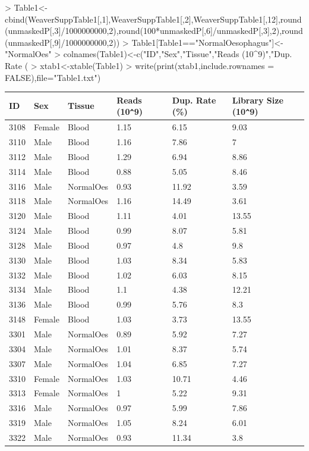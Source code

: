 \documentclass{article}
\begin{document}
\begin{Schunk}
\begin{Sinput}
> Table1<-cbind(WeaverSuppTable1[,1],WeaverSuppTable1[,2],WeaverSuppTable1[,12],round(unmaskedP[,3]/1000000000,2),round(100*unmaskedP[,6]/unmaskedP[,3],2),round(unmaskedP[,9]/1000000000,2))
> Table1[Table1=="NormalOesophagus"]<-"NormalOes"
> colnames(Table1)<-c("ID","Sex","Tissue","Reads (10^9)","Dup. Rate (%
> xtab1<-xtable(Table1)
> write(print(xtab1,include.rownames = FALSE),file="Table1.txt")
\end{Sinput}
\begin{table}[ht]
\centering
\begin{tabular}{llllll}
  \hline
ID & Sex & Tissue & Reads (10\verb|^|9) & Dup. Rate (\%) & Library Size (10\verb|^|9) \\ 
  \hline
3108 & Female & Blood & 1.15 & 6.15 & 9.03 \\ 
  3110 & Male & Blood & 1.16 & 7.86 & 7 \\ 
  3112 & Male & Blood & 1.29 & 6.94 & 8.86 \\ 
  3114 & Male & Blood & 0.88 & 5.05 & 8.46 \\ 
  3116 & Male & NormalOes & 0.93 & 11.92 & 3.59 \\ 
  3118 & Male & NormalOes & 1.16 & 14.49 & 3.61 \\ 
  3120 & Male & Blood & 1.11 & 4.01 & 13.55 \\ 
  3124 & Male & Blood & 0.99 & 8.07 & 5.81 \\ 
  3128 & Male & Blood & 0.97 & 4.8 & 9.8 \\ 
  3130 & Male & Blood & 1.03 & 8.34 & 5.83 \\ 
  3132 & Male & Blood & 1.02 & 6.03 & 8.15 \\ 
  3134 & Male & Blood & 1.1 & 4.38 & 12.21 \\ 
  3136 & Male & Blood & 0.99 & 5.76 & 8.3 \\ 
  3148 & Female & Blood & 1.03 & 3.73 & 13.55 \\ 
  3301 & Male & NormalOes & 0.89 & 5.92 & 7.27 \\ 
  3304 & Male & NormalOes & 1.01 & 8.37 & 5.74 \\ 
  3307 & Male & NormalOes & 1.04 & 6.85 & 7.27 \\ 
  3310 & Female & NormalOes & 1.03 & 10.71 & 4.46 \\ 
  3313 & Female & NormalOes & 1 & 5.22 & 9.31 \\ 
  3316 & Male & NormalOes & 0.97 & 5.99 & 7.86 \\ 
  3319 & Male & NormalOes & 1.05 & 8.24 & 6.01 \\ 
  3322 & Male & NormalOes & 0.93 & 11.34 & 3.8 \\ 
   \hline
\end{tabular}
\end{table}\end{Schunk}
\end{document}
